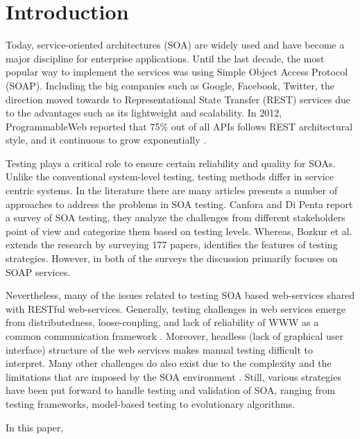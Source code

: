 \documentclass[english]{tktltiki}
\begin{document}
\section{Introduction}
Today, service-oriented architectures (SOA) are widely used and have become a major discipline for enterprise applications. Until the last decade, the most popular way to implement the services was using Simple Object Access Protocol (SOAP). Including the big companies such as Google, Facebook, Twitter, the direction moved towards to Representational State Transfer (REST) services due to the advantages such as its lightweight and scalability. In 2012, ProgrammableWeb reported that 75\% out of all APIs follows REST architectural style, and it continuous to grow exponentially \cite{programmableweb}.

Testing plays a critical role to ensure certain reliability and quality for SOAs. Unlike the conventional system-level testing, testing methods differ in service centric systems. In the literature there are many articles presents a number of approaches to address the problems in SOA testing. Canfora and Di Penta \cite{canfora2009service} report a survey of SOA testing, they analyze the challenges from different stakeholders point of view and categorize them based on testing levels. Whereas, Bozkur et al. \cite{bozkurt2013testing} extends the research by surveying 177 papers, identifies the features of testing strategies. However, in both of the surveys the discussion primarily focuses on SOAP services.

Nevertheless, many of the issues related to testing SOA based web-services shared with RESTful web-services. Generally, testing challenges in web services emerge from distributedness, loose-coupling, and lack of reliability of WWW as a common communication framework \cite{chakrabarti2009test}. Moreover, headless (lack of graphical user interface) structure of the web services makes manual testing difficult to interpret. Many other challenges do also exist due to the complexity and the limitations that are imposed by the SOA environment \cite{canfora2006testing, canfora2009service, bozkurt2013testing}. Still, various strategies have been put forward to handle testing and validation of SOA, ranging from testing frameworks, model-based testing to evolutionary algorithms.

In this paper, 
\end{document}
